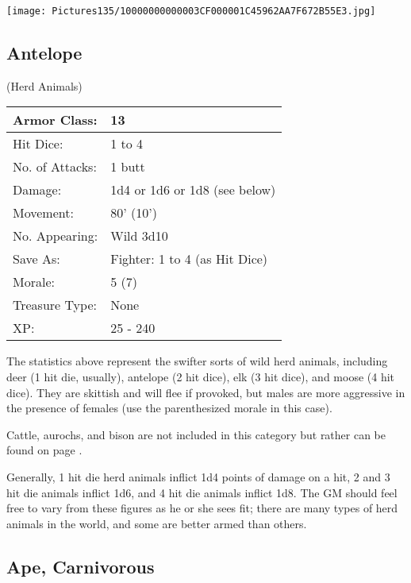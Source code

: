 \documentclass[a4paper,twoside,openany,10pt]{book}
\begin{document}
\begin{multicols}{2}
\vfill

\begin{center}
	\texttt{[image: Pictures135/10000000000003CF000001C45962AA7F672B55E3.jpg]}
\end{center}

\columnbreak

\subsection*{Antelope}(Herd Animals)\label{antelope}

\begin{tabularx}{0.48\textwidth}{ll}
Armor Class: & 13 \\\hline
Hit Dice: & 1 to 4 \\\hline
No. of Attacks: & 1 butt \\\hline
Damage: & 1d4 or 1d6 or 1d8 (see below) \\\hline
Movement: & 80' (10') \\\hline
No. Appearing: & Wild 3d10 \\\hline
Save As: & Fighter: 1 to 4 (as Hit Dice) \\\hline
Morale: & 5 (7) \\\hline
Treasure Type: & None \\\hline
XP: & 25 - 240 \\\hline
\end{tabularx}\medskip

The statistics above represent the swifter sorts of wild herd animals, including deer (1 hit die, usually), antelope (2 hit dice), elk (3 hit dice), and moose (4 hit dice). They are skittish and will flee if provoked, but males are more aggressive in the presence of females (use the parenthesized morale in this case).

Cattle, aurochs, and bison are not included in this category but rather can be found on page \hyperlink{cattle-including-aurochs-and-bison}{\pageref{cattle-including-aurochs-and-bison}}. 

Generally, 1 hit die herd animals inflict 1d4 points of damage on a hit, 2 and 3 hit die animals inflict 1d6, and 4 hit die animals inflict 1d8. The GM should feel free to vary from these figures as he or she sees fit; there are many types of herd animals in the world, and some are better armed than others.

\subsection*{Ape, Carnivorous}\label{ape-carnivorous}


\end{multicols}
\end{document}
